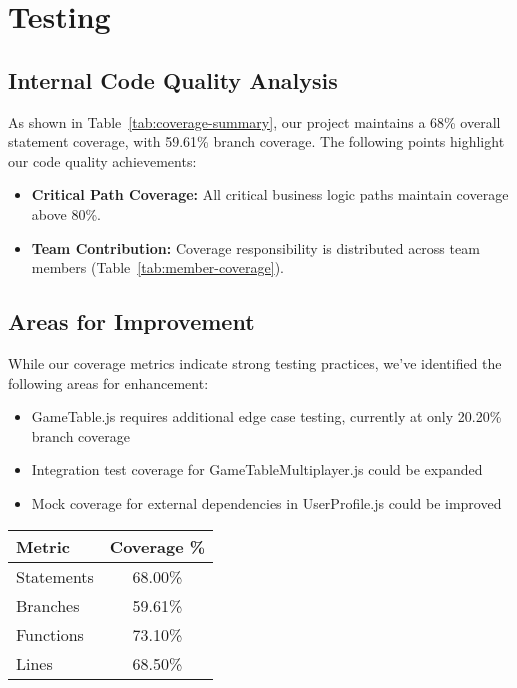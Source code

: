 

\begin{minipage}{\textwidth}
\section {Testing}
\subsection{Internal Code Quality Analysis}
As shown in Table~\ref{tab:coverage-summary}, our project maintains a 68\% overall statement coverage, with 59.61\% branch coverage. The following points highlight our code quality achievements:
\begin{itemize}
    \item \textbf{Critical Path Coverage:} All critical business logic paths maintain coverage above 80\%.
    \item \textbf{Team Contribution:} Coverage responsibility is distributed across team members (Table~\ref{tab:member-coverage}).
\end{itemize}

\subsection{Areas for Improvement}
While our coverage metrics indicate strong testing practices, we've identified the following areas for enhancement:
\begin{itemize}
    \item GameTable.js requires additional edge case testing, currently at only 20.20\% branch coverage
    \item Integration test coverage for GameTableMultiplayer.js could be expanded
    \item Mock coverage for external dependencies in UserProfile.js could be improved
\end{itemize}

\vspace{1em}
\begin{center}
\label{tab:coverage-summary}
\begin{tabular}{|l|c|}
\hline
\textbf{Metric} & \textbf{Coverage \%} \\
\hline
Statements & 68.00\% \\
Branches & 59.61\% \\
Functions & 73.10\% \\
Lines & 68.50\% \\
\hline
\end{tabular}


\end{center}
\end{minipage}
